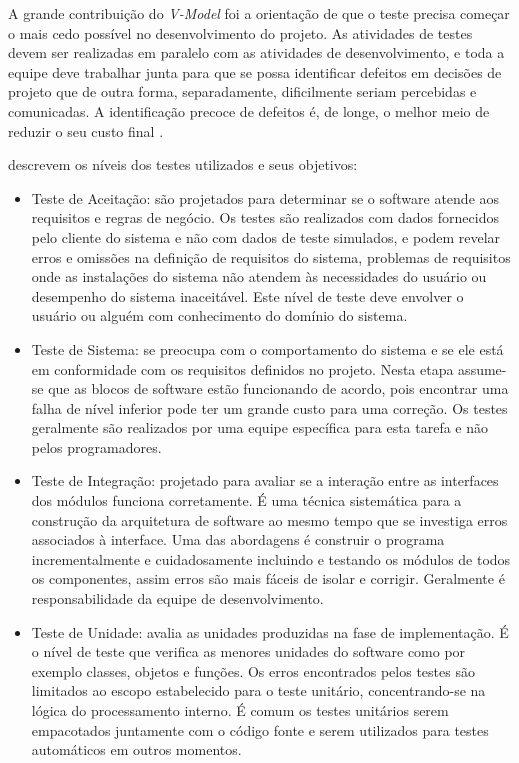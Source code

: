 A grande contribuição do \textit{V-Model} foi a orientação de que o teste precisa começar o mais cedo possível no desenvolvimento do projeto. As atividades de testes devem ser realizadas em paralelo com as atividades de desenvolvimento, e toda a equipe deve trabalhar junta para que se possa identificar defeitos em decisões de projeto que de outra forma, separadamente, dificilmente seriam percebidas e comunicadas. A identificação precoce de defeitos é, de longe, o melhor meio de reduzir o seu custo final \cite{ammann2016introduction}.

\cite{graham2008foundations,ammann2016introduction} descrevem os níveis dos testes utilizados e seus objetivos:

\begin{itemize}
\item Teste de Aceitação: são projetados para determinar se o software atende aos requisitos e regras de negócio. Os testes são realizados com dados fornecidos pelo cliente do sistema e não com dados de teste simulados, e podem revelar erros e omissões na definição de requisitos do sistema, problemas de requisitos onde as instalações do sistema não atendem às necessidades do usuário ou desempenho do sistema inaceitável. Este nível de teste deve envolver o usuário ou alguém com conhecimento do domínio do sistema. 
\item Teste de Sistema: se preocupa com o comportamento do sistema e se ele está em conformidade com os requisitos definidos no projeto. Nesta etapa assume-se que as blocos de software estão funcionando de acordo, pois encontrar uma falha de nível inferior pode ter um grande custo para uma correção. Os testes geralmente são realizados por uma equipe específica para esta tarefa e não pelos programadores.
\item Teste de Integração: projetado para avaliar se a interação entre as interfaces dos módulos funciona corretamente. É uma técnica sistemática para a construção da arquitetura de software ao mesmo tempo que se investiga erros associados à interface. Uma das abordagens é construir o programa incrementalmente e cuidadosamente incluindo e testando os módulos de todos os componentes, assim erros são mais fáceis de isolar e corrigir. Geralmente é responsabilidade da equipe de desenvolvimento.
\item Teste de Unidade: avalia as unidades produzidas na fase de implementação. É o nível de teste que verifica as menores unidades do software como por exemplo classes, objetos e funções. Os erros encontrados pelos testes são limitados ao escopo estabelecido para o teste unitário,  concentrando-se na lógica do processamento interno.  É comum os testes unitários serem empacotados juntamente com o código fonte e serem utilizados para testes automáticos em outros momentos.
\end{itemize}


